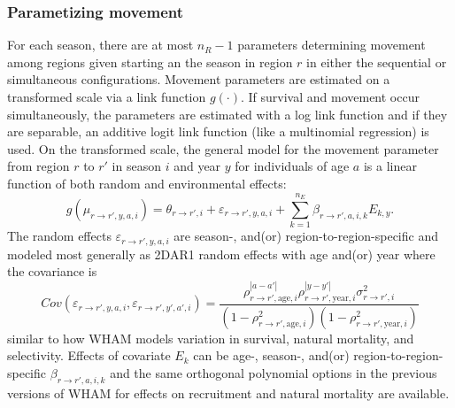 \documentclass[
]{article}
\begin{document}
\hypertarget{parametizing-movement}{%
\subsubsection*{Parametizing movement}\label{parametizing-movement}}

For each season, there are at most \(n_R-1\) parameters determining
movement among regions given starting an the season in region \(r\) in
either the sequential or simultaneous configurations. Movement
parameters are estimated on a transformed scale via a link function
\(g(\cdot)\). If survival and movement occur simultaneously, the
parameters are estimated with a log link function and if they are
separable, an additive logit link function (like a multinomial
regression) is used. On the transformed scale, the general model for the
movement parameter from region \(r\) to \(r'\) in season \(i\) and year
\(y\) for individuals of age \(a\) is a linear function of both random
and environmental effects: \begin{equation*}
  g(\mu_{r\rightarrow r',y,a,i}) = \theta_{r\rightarrow r',i} + \varepsilon_{r\rightarrow r',y,a,i} + \sum^{n_E}_{k=1} \beta_{r \rightarrow r',a,i,k} E_{k,y}.
\end{equation*} The random effects
\(\varepsilon_{r\rightarrow r',y,a,i}\) are season-, and(or)
region-to-region-specific and modeled most generally as 2DAR1 random
effects with age and(or) year where the covariance is \begin{equation*}
  Cov\left(\varepsilon_{r\rightarrow r',y,a,i},\varepsilon_{r\rightarrow r',y',a',i}\right) =   \frac{\rho_{r\rightarrow r',\text{age},i}^{|a-a'|}\rho_{r\rightarrow r',\text{year},i}^{|y-y'|}\sigma^2_{r\rightarrow r',i}}{\left(1 -  \rho_{r\rightarrow r',\text{age},i}^2\right)\left(1 - \rho_{r\rightarrow r',\text{year},i}^2\right)}
\end{equation*} similar to how WHAM models variation in survival,
natural mortality, and selectivity. Effects of covariate \(E_k\) can be
age-, season-, and(or) region-to-region-specific
\(\beta_{r\rightarrow r',a,i,k}\) and the same orthogonal polynomial
options in the previous versions of WHAM for effects on recruitment and
natural mortality are available.
\end{document}
